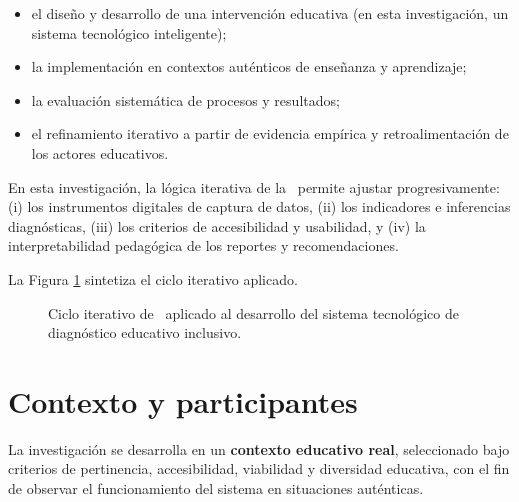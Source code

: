 \begin{refsection}
\begin{itemize}
\item el diseño y desarrollo de una intervención educativa (en esta investigación, un sistema tecnológico inteligente);
\item la implementación en contextos auténticos de enseñanza y aprendizaje;
\item la evaluación sistemática de procesos y resultados;
\item el refinamiento iterativo a partir de evidencia empírica y retroalimentación de los actores educativos.
\end{itemize}

En esta investigación, la lógica iterativa de la \DBR\ permite ajustar progresivamente: (i) los instrumentos digitales de captura de datos, (ii) los indicadores e inferencias diagnósticas, (iii) los criterios de accesibilidad y usabilidad, y (iv) la interpretabilidad pedagógica de los reportes y recomendaciones.

La Figura \ref{fig:dbr-ciclo} sintetiza el ciclo iterativo aplicado.

\begin{figure}[htbp]
\centering
{}
\caption{Ciclo iterativo de \DBR\ aplicado al desarrollo del sistema tecnológico de diagnóstico educativo inclusivo.}
\label{fig:dbr-ciclo}
\end{figure}

\section{Contexto y participantes}

La investigación se desarrolla en un \textbf{contexto educativo real}, seleccionado bajo criterios de pertinencia, accesibilidad, viabilidad y diversidad educativa, con el fin de observar el funcionamiento del sistema en situaciones auténticas.


\end{refsection}
